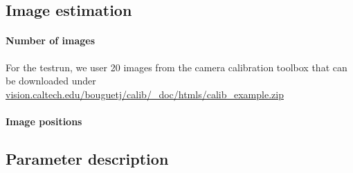 \documentclass{scrartcl}
\begin{document}
\subsection{Image estimation}
\paragraph{Number of images}

For the testrun, we user 20 images from the camera calibration toolbox that can be downloaded under \href{http://www.vision.caltech.edu/bouguetj/calib_doc/htmls/calib_example.zip}{vision.caltech.edu/bouguetj/calib/\_doc/htmls/calib\_example.zip}

\paragraph{Image positions}


\subsection{Parameter description}
\end{document}
